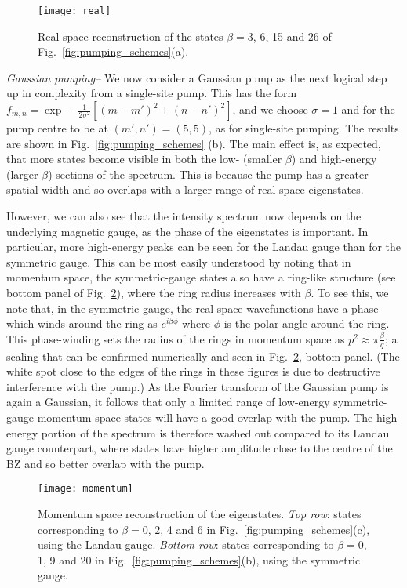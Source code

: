 \begin{figure}[tb]
  \centering
  \texttt{[image: real]} %
  \caption{Real space reconstruction of the states $\beta=3$, 6, 15
    and 26 of Fig.~\ref{fig:pumping_schemes}(a).}
  \label{fig:delta_real_sp}
\end{figure}

{\em{Gaussian pumping--}} We now consider a Gaussian pump as the next logical step up in complexity from a single-site pump. This has the form $f_{m,n} = \exp- \frac{1}{2\sigma^2} \left[(m-m')^2 + (n-n')^2
\right]$, and we choose $\sigma =1$ and for the pump centre to be at $(m',n') = (5,5)$, as for single-site pumping. The results are shown in Fig.~\ref{fig:pumping_schemes} (b). The main effect is, as expected, that more states
become visible in both the low- (smaller $\beta$) and high-energy (larger $\beta$) sections of the spectrum. This is because the pump has a greater spatial width and so overlaps with a larger range of real-space eigenstates. 

However, we can also see that the intensity spectrum now depends on the underlying magnetic gauge, as the phase of the eigenstates is important. In particular, more high-energy peaks can be seen for the Landau gauge than for the symmetric gauge. This can be most easily understood by noting that in momentum space, the symmetric-gauge states also have a ring-like structure (see bottom panel of Fig.~\ref{fig:hom_mom_sp}), where the ring radius increases with $\beta$. To see this, we note that, in the symmetric gauge, the real-space wavefunctions have a phase which
winds around the ring as $e^{i\beta \phi}$ where $\phi$ is the polar angle around the ring. This phase-winding sets the radius of the rings in momentum space as $p^2 \approx \pi \frac{\beta}{q}$; a scaling that can be confirmed numerically and seen in Fig.~\ref{fig:hom_mom_sp}, bottom panel. (The white spot close to the edges of the rings in these figures is due to destructive interference with the pump.)  As the Fourier transform of the Gaussian pump is again a Gaussian, it follows that only a limited range of low-energy symmetric-gauge momentum-space states will have a good overlap with the pump. The high energy portion of the spectrum is therefore washed out compared to its Landau gauge
counterpart, where states have higher amplitude close to the centre of the BZ and so better overlap with the pump. 

\begin{figure}[tb]\centering
  \texttt{[image: momentum]} %
  \caption{Momentum space reconstruction of the
    eigenstates. \emph{Top row}: states corresponding to $\beta=0$, 2,
    4 and 6 in Fig.~\ref{fig:pumping_schemes}(c), using the
    Landau gauge.  \emph{Bottom row}: states corresponding to
    $\beta=0$, 1, 9 and 20 in Fig.~\ref{fig:pumping_schemes}(b), using the symmetric gauge.}
  \label{fig:hom_mom_sp}
\end{figure}

